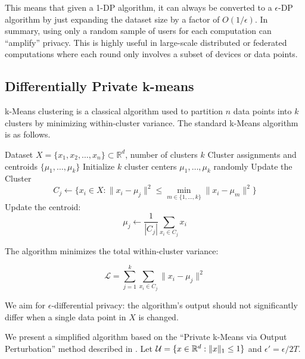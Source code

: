 \documentclass[11pt, a4paper]{article}
\begin{document}
This means that given a 1-DP algorithm, it can always be converted to a $\epsilon$-DP algorithm by
just expanding the dataset size by a factor of $O(1/\epsilon)$. 
In summary, using only a random sample of users for each computation can ``amplify'' privacy.
This is highly useful in large-scale distributed or federated computations where each round only involves a subset of devices or data points.


\subsection{Differentially Private k-means}

k-Means clustering is a classical algorithm used to partition $n$ data points into $k$ clusters by minimizing within-cluster variance.
The standard k-Means algorithm is as follows.
\begin{algorithm}[h!]
\caption{k-Means Clustering}
\begin{algorithmic}[1]
\REQUIRE Dataset $X = \{x_1, x_2, \dots, x_n\} \subset \mathbb{R}^d$, number of clusters $k$
\ENSURE Cluster assignments and centroids $\{\mu_1, \dots, \mu_k\}$
\STATE Initialize $k$ cluster centers $\mu_1, \dots, \mu_k$ randomly
    \STATE  Update the Cluster
        \[
        C_j \leftarrow \{ x_i \in X: \|x_i - \mu_j\|^2 \leq \min_{m \in \{1, \dots, k\}} \|x_i - \mu_m\|^2\}
        \]
    \ENDFOR
        \STATE Update the centroid:
        \[
        \mu_j \leftarrow \frac{1}{|C_j|} \sum_{x_i \in C_j} x_i
        \]
    \ENDFOR
\ENDFOR
\end{algorithmic}
\end{algorithm}


The algorithm minimizes the total within-cluster variance:

\[
\mathcal{L} = \sum_{j=1}^{k} \sum_{x_i \in C_j} \|x_i - \mu_j\|^2
\]


We aim for $\epsilon$-differential privacy:
the algorithm's output should not significantly differ when a single data point in $X$ is changed.

We present a simplified algorithm based on the ``Private k-Means via Output Perturbation'' 
method described in \cite{nissim2007smooth, dwork2014algorithmic}.
Let ${\cal U} = \{x\in\mathbb{R}^d : \|x\|_1\leq 1\}$ and $\epsilon' = \epsilon/2T$.
\end{document}
